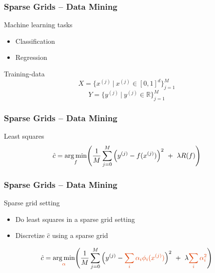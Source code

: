 \begin{frame}
  \frametitle{Sparse Grids -- Data Mining}
  \topline
  \vspace{-10px}
  \begin{block}{Machine learning tasks}
    \begin{itemize}
      \item Classification
      \item Regression
    \end{itemize}
  \end{block}
    \begin{block}{Training-data}
    $$ X = \{x^{(j)} \ | \ x^{(j)} \in [0, 1]^d\}_{j = 1}^M$$
    \vspace{0px}
    $$Y = \{y^{(j)} \ | \ y^{(j)} \in \mathbb{R}\}_{j = 1}^M$$
  \end{block}
\end{frame}

\begin{frame}
  \frametitle{Sparse Grids -- Data Mining}
  \topline
  \vspace{-10px}
  \begin{block}{Least squares}
    $$\hat{c} = \underset{f}{\text{arg \hspace{-0.5mm}min}}\Bigg(\frac{1}{M}\sum\limits_{j = 0}^{M}{\Big(y^{(j)} - f(x^{(j)})\Big)^2 \ + \ \lambda R(f)} \Bigg)$$
  \end{block}
\end{frame}

\begin{frame}
  \frametitle{Sparse Grids -- Data Mining}
  \topline
  \vspace{-10px}
  \begin{block}{Sparse grid setting}
    \begin{itemize}
    \item Do least squares in a sparse grid setting
    \item Discretize $\hat{c}$ using a sparse grid
    \end{itemize}
    \vspace{20px}
    $$\hat{c} = \underset{\color{uipoppy}{\alpha}}{\text{arg \hspace{-0.5mm}min}}\Bigg(\frac{1}{M}
    \sum\limits_{j = 0}^{M}{\Big(y^{(j)} - \color{uipoppy}{\sum_i{\alpha_i}\phi_i(x^{(j)})}\color{black}\Big)^2 \ + \ 
      \lambda \color{uipoppy}{\sum_i{\alpha_i^2}}}\color{black} \Bigg)$$
  \end{block}
\end{frame}


